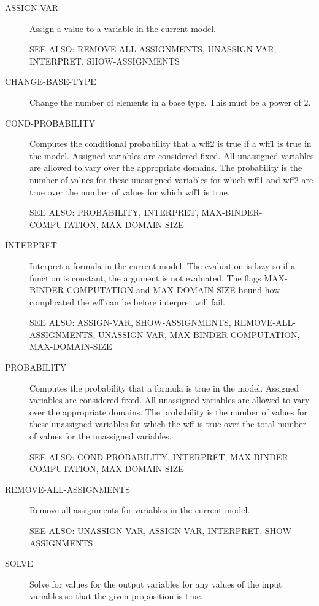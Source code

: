\begin{description} 
\item[ASSIGN-VAR]  
Assign a value to a variable in the current model.

SEE ALSO: REMOVE-ALL-ASSIGNMENTS, UNASSIGN-VAR, INTERPRET, SHOW-ASSIGNMENTS

\item[CHANGE-BASE-TYPE]  
Change the number of elements in a base type.
This must be a power of 2.

\item[COND-PROBABILITY]  
Computes the conditional probability that a wff2 is true if a wff1 is
true in the model.  Assigned variables are considered fixed.  All
unassigned variables are allowed to vary over the appropriate domains.
The probability is the number of values for these unassigned variables
for which wff1 and wff2 are true over the number of values for which
wff1 is true.

SEE ALSO: PROBABILITY, INTERPRET, MAX-BINDER-COMPUTATION, MAX-DOMAIN-SIZE

\item[INTERPRET]  
Interpret a formula in the current model.  The evaluation is lazy so
if a function is constant, the argument is not evaluated.  The flags
MAX-BINDER-COMPUTATION and MAX-DOMAIN-SIZE bound how complicated the
wff can be before interpret will fail.

SEE ALSO: ASSIGN-VAR, SHOW-ASSIGNMENTS, REMOVE-ALL-ASSIGNMENTS, UNASSIGN-VAR,
  MAX-BINDER-COMPUTATION, MAX-DOMAIN-SIZE

\item[PROBABILITY]  
Computes the probability that a formula is true in the model.
Assigned variables are considered fixed.  All unassigned variables are
allowed to vary over the appropriate domains.  The probability is the
number of values for these unassigned variables for which the wff is true
over the total number of values for the unassigned variables.

SEE ALSO: COND-PROBABILITY, INTERPRET, MAX-BINDER-COMPUTATION, MAX-DOMAIN-SIZE

\item[REMOVE-ALL-ASSIGNMENTS]  
Remove all assignments for variables in the current model.

SEE ALSO: UNASSIGN-VAR, ASSIGN-VAR, INTERPRET, SHOW-ASSIGNMENTS

\item[SOLVE]  
Solve for values for the output variables for any values of the input
variables so that the given proposition is true.


\end{description}

